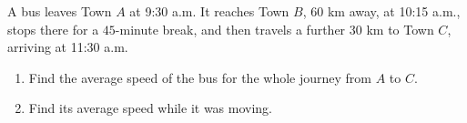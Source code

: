 A bus leaves Town $A$ at 9:30 a.m. It reaches Town $B$, $60$ km away, at 10:15 a.m., stops there for a $45$-minute break, and then travels a further $30$ km to Town $C$, arriving at 11:30 a.m.
\begin{enumerate}
\item[(a)] Find the average speed of the bus for the whole journey from $A$ to $C$.
\item[(b)] Find its average speed while it was moving.
\end{enumerate}
